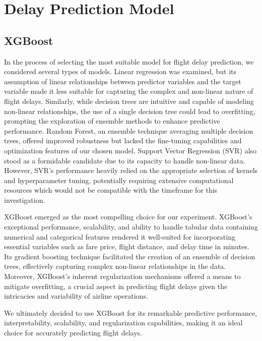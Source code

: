 \documentclass{article}
\begin{document}
\section{Delay Prediction Model}
    \subsection{XGBoost}
    In the process of selecting the most suitable model for flight delay prediction, we considered several types of models. Linear regression was examined, but its assumption of linear relationships between predictor variables and the target variable made it less suitable for capturing the complex and non-linear nature of flight delays. Similarly, while decision trees are intuitive and capable of modeling non-linear relationships, the use of a single decision tree could lead to overfitting, prompting the exploration of ensemble methods to enhance predictive performance. Random Forest, an ensemble technique averaging multiple decision trees, offered improved robustness but lacked the fine-tuning capabilities and optimization features of our chosen model. Support Vector Regression (SVR) also stood as a formidable candidate due to its capacity to handle non-linear data. However, SVR's performance heavily relied on the appropriate selection of kernels and hyperparameter tuning, potentially requiring extensive computational resources which would not be compatible with the timeframe for this investigation.

    XGBoost emerged as the most compelling choice for our experiment. XGBoost's exceptional performance, scalability, and ability to handle tabular data containing numerical and categorical features rendered it well-suited for incorporating essential variables such as fare price, flight distance, and delay time in minutes. Its gradient boosting technique facilitated the creation of an ensemble of decision trees, effectively capturing complex non-linear relationships in the data. Moreover, XGBoost's inherent regularization mechanisms offered a means to mitigate overfitting, a crucial aspect in predicting flight delays given the intricacies and variability of airline operations.

    We ultimately decided to use XGBoost for its remarkable predictive performance, interpretability, scalability, and regularization capabilities, making it an ideal choice for accurately predicting flight delays.
    
\end{document}
